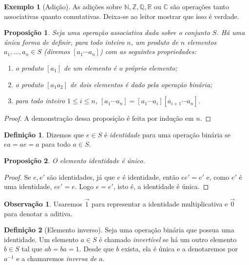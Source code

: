 \documentclass[a4paper,12pt]{article}
\theoremstyle{plain}
\newtheorem{proposicao}{Proposição}[section]
\theoremstyle{definition}
\newtheorem{definicao}{Definição}[section]
\newtheorem{observacao}{Observação}[section]
\newtheorem{exemplo}{Exemplo}[section]
\begin{document}
\begin{exemplo}[Adição]
	As adições sobre $\mathbb{N},\mathbb{Z},\mathbb{Q},\mathbb{R}$ ou $\mathbb{C}$ são operações tanto associativas quanto comutativas. Deixa-se ao leitor mostrar que isso é verdade.
\end{exemplo}

\begin{proposicao}
	Seja uma operação associativa dada sobre o conjunto
	\(S\). Há uma única forma de definir, para todo inteiro \(n\), um
	produto de \(n\) elementos \(a_1,\dots,a_n \in S\) (diremos
	\([a_1\dotsb a_n]\)) com as seguintes propriedades:
	
	\begin{enumerate}
		\def\labelenumi{\arabic{enumi}.}
		\item
		o produto \([a_1]\) de um elemento é o próprio elemento;
		\item
		o produto \([a_1a_2]\) de dois elementos é dado pela operação binária;
		\item
		para todo inteiro \(1\leq i\leq n\),
		\([a_1\dotsb a_n] = [a_1\dotsb a_i][a_{i+1}\dotsb a_n]\).
	\end{enumerate}
\end{proposicao}

\begin{proof}
	A demonstração dessa proposição é feita por indução em \(n\).
\end{proof}

\begin{definicao}
	Dizemos que \(e\in S\) é \emph{identidade} para uma operação binária se \(ea = ae = a\) para todo \(a\in S\).
\end{definicao}

\begin{proposicao}
	O elemento identidade é único.
\end{proposicao}
\begin{proof}
	Se \(e,e'\) são identidades, já que \(e\) é identidade, então \(ee' = e'\) e, como $e'$ é uma identidade, \(ee' = e\). Logo \(e = e'\), isto é, a identidade é única.
\end{proof}

\begin{observacao}
	Usaremos $\vec{1}$ para representar a identidade multiplicativa e $\vec{0}$ para denotar a aditiva.
\end{observacao}

\begin{definicao}[Elemento inverso]
	Seja uma operação binária que possua uma identidade. Um elemento \(a\in S\) é chamado \emph{invertível} se há um outro elemento \(b\in S\) tal que \(ab = ba = 1\). Desde que \(b\) exista, ela é única e a denotaremos por \(a^{-1}\) e a chamaremos
	\emph{inversa de $a$}.
\end{definicao}
\end{document}
